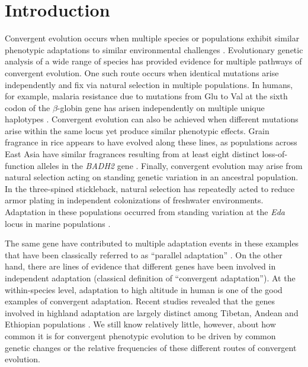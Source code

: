 \section*{Introduction}
\noindent Convergent evolution occurs when multiple species or populations exhibit similar phenotypic adaptations to similar environmental challenges \cite[]{Wood_2005_15881688,Arendt_2008_18022278,Elmer_2011_21459472}.
Evolutionary genetic analysis of a wide range of species has provided evidence for multiple pathways of convergent evolution. 
One such route occurs when identical mutations arise independently and fix via natural selection in multiple populations. In humans, for example, malaria resistance due to mutations from Glu to Val at the sixth codon of the $\beta$-globin gene has arisen independently on multiple unique haplotypes  \cite[]{Currat_2002_11741197,Kwiatkowski_2005_16001361}.  
Convergent evolution can also be achieved when different mutations arise within the same locus yet produce similar phenotypic effects.  
Grain fragrance in rice appears to have evolved along these lines, as populations across East Asia have similar fragrances resulting from at least eight distinct loss-of-function alleles in the  \emph{BADH2} gene \cite[]{Kovach_2009_19706531}.  
Finally, convergent evolution may arise from natural selection acting on standing genetic variation in an ancestral population.  
In the three-spined stickleback, natural selection has repeatedly acted to reduce armor plating in independent colonizations of freshwater environments.  
Adaptation in these populations occurred from standing variation at the \emph{Eda} locus in marine populations \cite[]{Colosimo_2005_15790847}.  

The same gene have contributed to multiple adaptation events in these examples that have been classically referred to as ``parallel adaptation'' \cite[]{Wood_2005_15881688}.
On the other hand, there are lines of evidence that different genes have been involved in independent adaptation (classical definition of ``convergent adaptation'').
At the within-species level, adaptation to high altitude in human is one of the good examples of convergent adaptation.
Recent studies revealed that the genes involved in highland adaptation are largely distinct among Tibetan, Andean and Ethiopian populations \cite[]{Bigham_2010_20838600,Scheinfeldt_2012_22264333,Alkorta-Aranburu_2012_23236293}.
We still know relatively little, however, about how common it is for convergent phenotypic evolution to be driven by common genetic changes or the relative frequencies of these different routes of convergent evolution.

